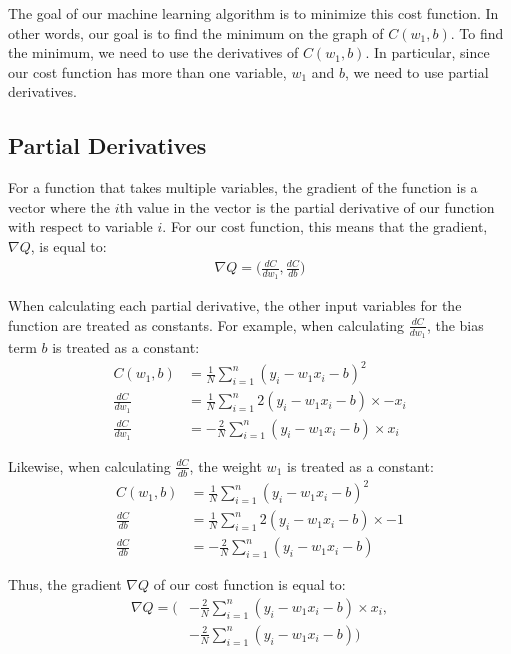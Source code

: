 \documentclass[12pt, demo]{article}
\begin{document}
The goal of our machine learning algorithm is to minimize this cost function. In other words, our goal is to find the minimum on the graph of $C(w_1, b)$. To find the minimum, we need to use the derivatives of $C(w_1, b)$. In particular, since our cost function has more than one variable, $w_1$ and $b$, we need to use partial derivatives.

\subsection*{Partial Derivatives}

For a function that takes multiple variables, the gradient of the function is a vector where the $i$th value in the vector is the partial derivative of our function with respect to variable $i$. For our cost function, this means that the gradient, $\nabla Q$, is equal to:
\begin{align*}
	\nabla Q = \Big(\frac{dC}{dw_1}, \frac{dC}{db}\Big)
\end{align*}

When calculating each partial derivative, the other input variables for the function are treated as constants. For example, when calculating $\frac{dC}{dw_1}$, the bias term $b$ is treated as a constant:
\begin{align*}
	C(w_1, b)       & = \frac{1}{N} \sum_{i=1}^{n} (y_i - w_1x_i - b)^2
	\\
	\frac{dC}{dw_1} & = \frac{1}{N} \sum_{i=1}^{n} 2(y_i - w_1x_i - b) \times -x_i
	\\
	\frac{dC}{dw_1} & = -\frac{2}{N} \sum_{i=1}^{n} (y_i - w_1x_i - b) \times x_i
\end{align*}

Likewise, when calculating $\frac{dC}{db}$, the weight $w_1$ is treated as a constant:
\begin{align*}
	C(w_1, b)     & = \frac{1}{N} \sum_{i=1}^{n} (y_i - w_1x_i - b)^2
	\\
	\frac{dC}{db} & = \frac{1}{N} \sum_{i=1}^{n} 2(y_i - w_1x_i - b) \times -1
	\\
	\frac{dC}{db} & = -\frac{2}{N} \sum_{i=1}^{n} (y_i - w_1x_i - b)
\end{align*}

Thus, the gradient $\nabla Q$ of our cost function is equal to:
\begin{align*}
	\nabla Q = \Big(
	 &
	-\frac{2}{N} \sum_{i=1}^{n} (y_i - w_1x_i - b) \times x_i,
	\\
	 & -\frac{2}{N} \sum_{i=1}^{n} (y_i - w_1x_i - b)
	\Big)
\end{align*}
\end{document}
